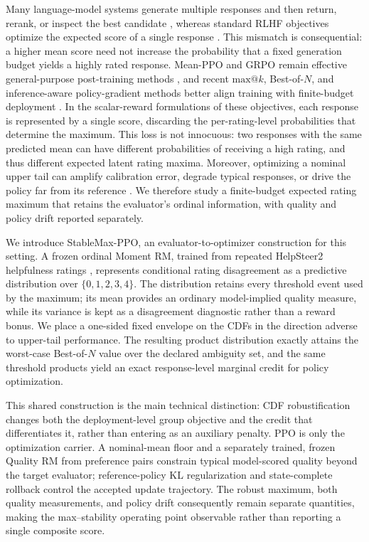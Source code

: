 \documentclass{article}
\newcommand{\method}{StableMax-PPO}
\theoremstyle{definition}
\theoremstyle{remark}
\begin{document}
Many language-model systems generate multiple responses and then return, rerank,
or inspect the best candidate \citep{nakano2021webgpt,cobbe2021training},
whereas standard RLHF objectives optimize the expected score of a single
response \citep{christiano2017deep,stiennon2020learning,ouyang2022training}. This mismatch is consequential: a higher
mean score need not increase the probability that a fixed generation budget
yields a highly rated response. Mean-PPO and GRPO remain effective
general-purpose post-training methods
\citep{shao2024deepseekmath,guo2025deepseekr1}, and recent
$\mathrm{max}@k$, Best-of-\(N\), and inference-aware policy-gradient methods
better align training with finite-budget deployment
\citep{chow2025inference,tang2025inference,walder2025pkpo,
bagirov2025best,li2026posttraining,poiani2026maxk}. In the scalar-reward formulations of these objectives, each response is
represented by a single score,
discarding the per-rating-level probabilities that determine the maximum. This
loss is not innocuous: two responses with the same predicted mean can have
different probabilities of receiving a high rating, and thus different
expected latent rating maxima. Moreover, optimizing a nominal upper tail can amplify
calibration error, degrade typical responses, or drive the policy far from its
reference \citep{gao2023scaling,kirk2024understanding}. We therefore study a
finite-budget expected rating maximum that retains the evaluator's ordinal
information, with quality and policy drift reported separately.

We introduce \method{}, an evaluator-to-optimizer construction for this
setting.  A frozen ordinal Moment RM, trained from repeated HelpSteer2
helpfulness ratings \citep{wang2024helpsteer2}, represents conditional rating
disagreement as a predictive distribution over \(\{0,1,2,3,4\}\).  The
distribution retains every threshold event used by the maximum; its mean
provides an ordinary model-implied quality measure, while its variance is kept
as a disagreement diagnostic rather than a reward bonus.  We place a one-sided
fixed envelope on the CDFs in the direction adverse to upper-tail
performance.  The resulting product distribution exactly attains the
worst-case Best-of-\(N\) value over the declared ambiguity set, and the same
threshold products yield an exact response-level marginal credit for policy
optimization.

This shared construction is the main technical distinction: CDF
robustification changes both the deployment-level group objective and the credit that
differentiates it, rather than entering as an auxiliary penalty.  PPO is only
the optimization carrier.  A nominal-mean floor and a separately trained,
frozen Quality RM from preference pairs constrain typical model-scored
quality beyond the target evaluator; reference-policy KL
regularization and state-complete rollback control the accepted update
trajectory.  The robust maximum, both quality measurements, and policy drift
consequently remain separate quantities, making the max--stability
operating point observable rather than reporting a single composite score.
\end{document}
